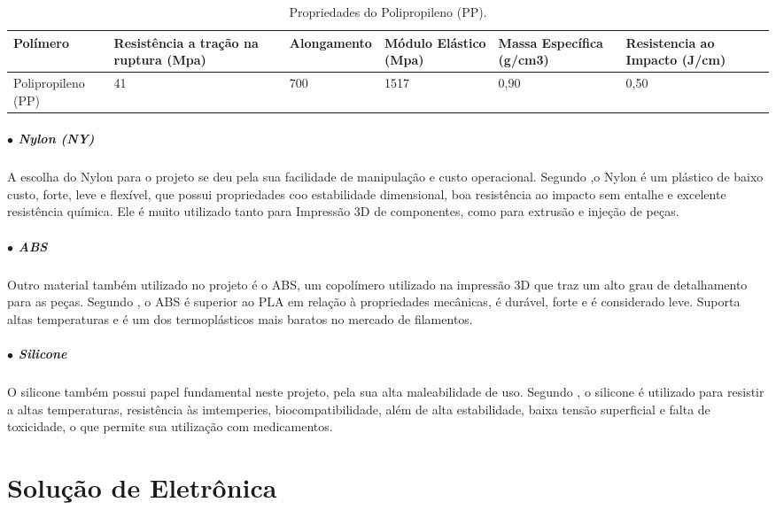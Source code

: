 \begin{table}[H]
    \centering
    \caption{Propriedades do Polipropileno (PP).}
    \label{fig:PropPP}
    \begin{adjustbox}{max width = \textwidth}
        \begin{tabular}{|L{2cm}|C{3cm}|C{2.8cm}|C{2cm}|C{2.5cm}|C{2.5cm}|}
            \hline
            \textbf{Polímero} & \textbf{Resistência a tração na ruptura (Mpa)} & \textbf{Alongamento } & \textbf{Módulo Elástico (Mpa)} & \textbf{Massa Específica (g/cm3)} & \textbf{Resistencia ao Impacto (J/cm)} \\ \hline
            
              Polipropileno (PP) & 41 & 700 & 1517  & 0,90 & 0,50
             \\ \hline
        \end{tabular}
    \end{adjustbox}
\end{table}

\subparagraph*{$\bullet$ Nylon (NY)} \hfill

A escolha do Nylon para o projeto se deu pela sua facilidade de manipulação e custo operacional. Segundo \cite{Imp3D_Polimeros},o Nylon é um plástico de baixo custo, forte, leve e flexível, que possui propriedades coo estabilidade dimensional, boa resistência ao impacto sem entalhe e excelente resistência química. Ele é muito utilizado tanto para Impressão 3D de componentes, como para extrusão e injeção de peças.

\subparagraph*{$\bullet$ ABS} \hfill

Outro material também utilizado no projeto é o ABS, um copolímero utilizado na impressão 3D que traz um alto grau de detalhamento para as peças. Segundo \cite{Imp3D_Polimeros}, o ABS é superior ao PLA em relação à propriedades mecânicas, é durável, forte e é considerado leve. Suporta altas temperaturas e é um dos termoplásticos mais baratos no mercado de filamentos. 

\subparagraph*{$\bullet$ Silicone} \hfill

O silicone também possui papel fundamental neste projeto, pela sua alta maleabilidade de uso. Segundo \cite{Silicone_estudo}, o silicone é utilizado para resistir a altas temperaturas, resistência às imtemperies, biocompatibilidade, além de alta estabilidade, baixa tensão superficial e falta de toxicidade, o que permite sua utilização com medicamentos.


\section{Solução de Eletrônica}

